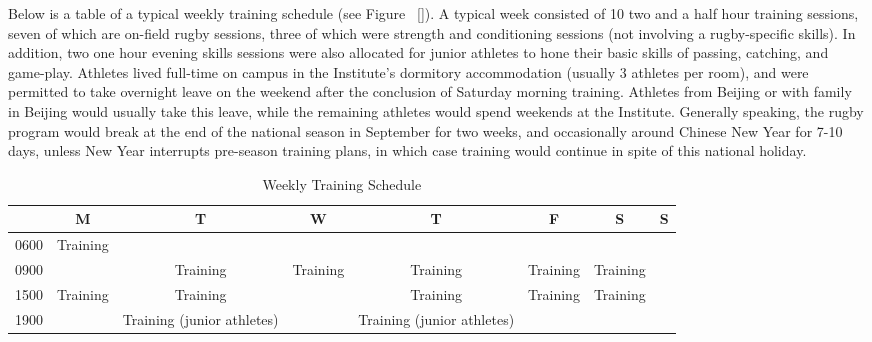   Below is a table of a typical weekly training schedule (see Figure ~\ref{}). A typical week consisted of 10 two and a half hour training sessions, seven of which are on-field rugby sessions, three of which were strength and conditioning sessions (not involving a rugby-specific skills).  In addition, two one hour evening skills sessions were also allocated for junior athletes to hone their basic skills of passing, catching, and game-play.  Athletes lived full-time on campus in the Institute's dormitory accommodation (usually 3 athletes per room), and were permitted to take overnight leave on the weekend after the conclusion of Saturday morning training.  Athletes from Beijing or with family in Beijing would usually take this leave, while the remaining athletes would spend weekends at the Institute.  Generally speaking, the rugby program would break at the end of the national season in September for two weeks, and occasionally around Chinese New Year for 7-10 days, unless New Year interrupts pre-season training plans, in which case training would continue in spite of this national holiday.

  \begin{landscape}
    \begin{table}[htpb]\caption{Weekly Training Schedule}
      \begin{center}
        \begin{small}
            \begin{tabular}{| c | c | c | c | c | c | c | c |}
              \hline
              & \bf M & \bf T & \bf W & \bf T & \bf F & \bf S & \bf S \\
              \hline
              0600 & Training &  &  & & & & \\
              \hline
              0900 &  & Training & Training & Training & Training & Training &  \\
                \hline
              1500 & Training & Training & & Training & Training & Training &  \\
                \hline
              1900 &  & Training (junior athletes) & & Training (junior athletes) & & & \\
                 \hline
            \end{tabular}
                \label{tab:tournamentData}
          \end{small}
        \end{center}
      \end{table}
  \end{landscape}
  \restoregeometry



